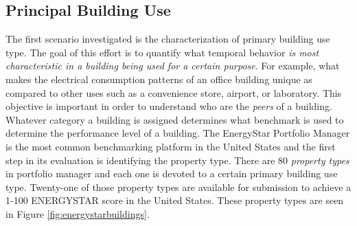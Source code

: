 \subsection{Principal Building Use}
\label{sec:buildinguse}

The first scenario investigated is the characterization of primary building use type. The goal of this effort is to quantify what temporal behavior \emph{is most characteristic in a building being used for a certain purpose}. For example, what makes the electrical consumption patterns of an office building unique as compared to other uses such as a convenience store, airport, or laboratory. This objective is important in order to understand who are the \emph{peers} of a building. Whatever category a building is assigned determines what benchmark is used to determine the performance level of a building. The EnergyStar Portfolio Manager is the most common benchmarking platform in the United States and the first step in its evaluation is identifying the property type. There are 80 \emph{property types} in portfolio manager and each one is devoted to a certain primary building use type. Twenty-one of those property types are available for submission to achieve a 1-100 ENERGYSTAR score in the United States. These property types are seen in Figure \ref{fig:energystarbuildings}.